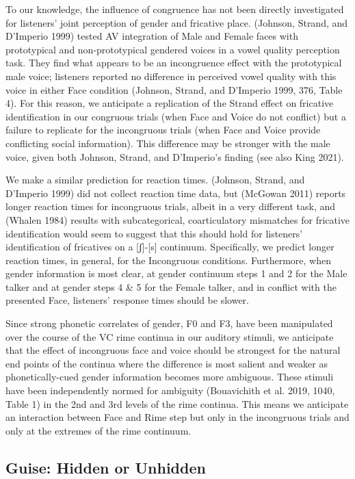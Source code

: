 \documentclass[
  letterpaper,
  DIV=11,
  numbers=noendperiod]{scrartcl}
\begin{document}
To our knowledge, the influence of congruence has not been directly
investigated for listeners' joint perception of gender and fricative
place. (Johnson, Strand, and D'Imperio 1999) tested AV integration of
Male and Female faces with prototypical and non-prototypical gendered
voices in a vowel quality perception task. They find what appears to be
an incongruence effect with the prototypical male voice; listeners
reported no difference in perceived vowel quality with this voice in
either Face condition (Johnson, Strand, and D'Imperio 1999, 376, Table
4). For this reason, we anticipate a replication of the Strand effect on
fricative identification in our congruous trials (when Face and Voice do
not conflict) but a failure to replicate for the incongruous trials
(when Face and Voice provide conflicting social information). This
difference may be stronger with the male voice, given both Johnson,
Strand, and D'Imperio's finding (see also King 2021).

We make a similar prediction for reaction times. (Johnson, Strand, and
D'Imperio 1999) did not collect reaction time data, but (McGowan 2011)
reports longer reaction times for incongruous trials, albeit in a very
different task, and (Whalen 1984) results with subcategorical,
coarticulatory mismatches for fricative identification would seem to
suggest that this should hold for listeners' identification of
fricatives on a {[}ʃ{]}-{[}s{]} continuum. Specifically, we predict
longer reaction times, in general, for the Incongruous conditions.
Furthermore, when gender information is most clear, at gender continuum
steps 1 and 2 for the Male talker and at gender steps 4 \& 5 for the
Female talker, and in conflict with the presented Face, listeners'
response times should be slower.

Since strong phonetic correlates of gender, F0 and F3, have been
manipulated over the course of the VC rime continua in our auditory
stimuli, we anticipate that the effect of incongruous face and voice
should be strongest for the natural end points of the continua where the
difference is most salient and weaker as phonetically-cued gender
information becomes more ambiguous. These stimuli have been
independently normed for ambiguity (Bouavichith et al. 2019, 1040, Table
1) in the 2nd and 3rd levels of the rime continua. This means we
anticipate an interaction between Face and Rime step but only in the
incongruous trials and only at the extremes of the rime continuum.

\subsection{Guise: Hidden or Unhidden}\label{sec-pred-guise}
\end{document}
